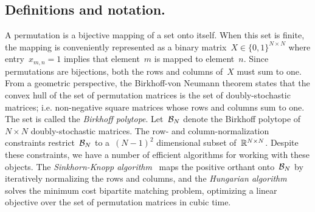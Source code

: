 \documentclass[twoside]{article}
\begin{document}
\subsection{Definitions and notation.}  A permutation is a bijective
mapping of a set onto itself.  When this set is finite, the mapping is
conveniently represented as a binary
matrix~${X \in \{0,1\}^{N \times N}}$ where entry~${x_{m,n}=1}$ implies that
element~$m$ is mapped to element~$n$.  Since permutations are
bijections, both the rows and columns of~$X$ must sum to one.  From a
geometric perspective, the Birkhoff-von Neumann theorem states that
the convex hull of the set of permutation matrices is the set of
doubly-stochastic matrices; i.e. non-negative square matrices whose
rows and columns sum to one. The set is called the \emph{Birkhoff
  polytope}.  Let~$\mathcal{B}_N$ denote the Birkhoff polytope of~$N \times N$
doubly-stochastic matrices.
The row- and column-normalization constraints
restrict~$\mathcal{B}_N$ to a~${(N-1)^2}$ dimensional subset
of~$\mathbb{R}^{N \times N}$.  Despite these constraints, we have a number
of efficient algorithms for working with these objects.  The
\emph{Sinkhorn-Knopp algorithm}~\citep{sinkhorn1967concerning}
maps the positive orthant onto~$\mathcal{B}_N$ by iteratively normalizing
the rows and columns, and the \emph{Hungarian
  algorithm}~\citep{kuhn1955hungarian, munkres1957algorithms} solves
the minimum cost bipartite matching problem, optimizing a linear
objective over the set of permutation matrices in cubic time.
\end{document}
